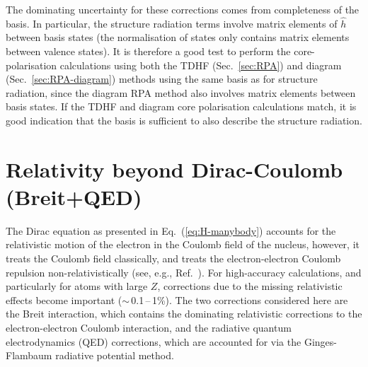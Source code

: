 \documentclass[10pt,twocolumn,a4paper]{article}%
\newcommand{\sixjs}[6]{\renewcommand\arraystretch{0.75}\ensuremath{\begin{Bmatrix}#1~#2~#3\\#4~#5~#6\end{Bmatrix}}}	%
\def\en{\ensuremath{\varepsilon}}
\begin{document}






The dominating uncertainty for these corrections comes from completeness of the basis.
In particular, the structure radiation terms involve matrix elements of $\hat h$ between basis states (the normalisation of states only contains matrix elements between valence states).
It is therefore a good test to perform the core-polarisation calculations using both the TDHF (Sec.~\ref{sec:RPA}) and diagram (Sec.~\ref{sec:RPA-diagram}) methods using the same basis as for structure radiation, since the diagram RPA method also involves matrix elements between basis states.
If the TDHF and diagram core polarisation calculations match, it is good indication that the basis is sufficient to also describe the structure radiation.




\section{Relativity beyond Dirac-Coulomb (Breit+QED)}


The Dirac equation as presented in Eq.~(\ref{eq:H-manybody})
accounts for the relativistic motion of the electron in the Coulomb field of the nucleus, however, it treats the Coulomb field classically, and treats the electron-electron Coulomb repulsion non-relativistically (see, e.g., Ref.~\cite{BetheBook}).
For high-accuracy calculations, and particularly for atoms with large $Z$, corrections due to the missing relativistic effects become important ($\sim$\,0.1\,--\,1\%).
The two corrections considered here are the
Breit interaction, which contains the dominating relativistic corrections to the electron-electron Coulomb interaction, and
the radiative quantum electrodynamics (QED) corrections, which are accounted for via the Ginges-Flambaum radiative potential method.
\end{document}
